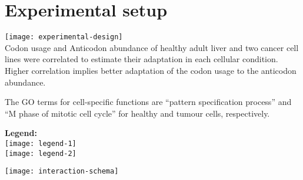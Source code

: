 \documentclass[a0,portrait]{a0poster}
\begin{document}
\begin{minipage}[][][t]{\textwidth}
    \section*{Experimental setup}
    \begin{minipage}[c]{0.50\textwidth}
        \texttt{[image: experimental-design]}
        \\[1cm]
        Codon usage and Anticodon abundance of healthy adult liver and two
        cancer cell lines were correlated to estimate their adaptation in each
        cellular condition. Higher correlation implies better adaptation of the
        codon usage to the anticodon abundance.

        The GO terms for cell-specific functions are “pattern specification
        process” and “M phase of mitotic cell cycle” for healthy and tumour
        cells, respectively.
    \end{minipage}%
    \hfill
    \begin{minipage}{0.20\textwidth}
        \centering
        \textbf{Legend:}\\[0.5cm]
        \texttt{[image: legend-1]}
        \\[2cm]
        \texttt{[image: legend-2]}
    \end{minipage}%
    \hfill
    \begin{minipage}{0.20\textwidth}
        \centering
        \texttt{[image: interaction-schema]}
    \end{minipage}%
\end{minipage}
\end{document}

